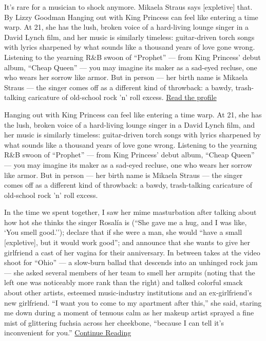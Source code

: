 It's rare for a musician to shock anymore. Mikaela Straus says
{[}expletive{]} that. By Lizzy Goodman Hanging out with King Princess
can feel like entering a time warp. At 21, she has the lush, broken
voice of a hard-living lounge singer in a David Lynch film, and her
music is similarly timeless: guitar-driven torch songs with lyrics
sharpened by what sounds like a thousand years of love gone wrong.
Listening to the yearning R\&B swoon of ``Prophet'' --- from King
Princess' debut album, ``Cheap Queen'' --- you may imagine its maker as
a sad-eyed recluse, one who wears her sorrow like armor. But in person
--- her birth name is Mikaela Straus --- the singer comes off as a
different kind of throwback: a bawdy, trash-talking caricature of
old-school rock 'n' roll excess.
\href{https://www.nytimes3xbfgragh.onion/interactive/2020/03/11/magazine/king-princess-profile.html}{Read
the profile}

Hanging out with King Princess can feel like entering a time warp. At
21, she has the lush, broken voice of a hard-living lounge singer in a
David Lynch film, and her music is similarly timeless: guitar-driven
torch songs with lyrics sharpened by what sounds like a thousand years
of love gone wrong. Listening to the yearning R\&B swoon of ``Prophet''
--- from King Princess' debut album, ``Cheap Queen'' --- you may imagine
its maker as a sad-eyed recluse, one who wears her sorrow like armor.
But in person --- her birth name is Mikaela Straus --- the singer comes
off as a different kind of throwback: a bawdy, trash-talking caricature
of old-school rock 'n' roll excess.

In the time we spent together, I saw her mime masturbation after talking
about how hot she thinks the singer Rosalía is (``She gave me a hug, and
I was like, `You smell good.''); declare that if she were a man, she
would ``have a small {[}expletive{]}, but it would work good''; and
announce that she wants to give her girlfriend a cast of her vagina for
their anniversary. In between takes at the video shoot for ``Ohio'' ---
a slow-burn ballad that descends into an unhinged rock jam --- she asked
several members of her team to smell her armpits (noting that the left
one was noticeably more rank than the right) and talked colorful smack
about other artists, esteemed music-industry institutions and an
ex-girlfriend's new girlfriend. ``I want you to come to my apartment
after this,'' she said, staring me down during a moment of tenuous calm
as her makeup artist sprayed a fine mist of glittering fuchsia across
her cheekbone, ``because I can tell it's inconvenient for you.''
\href{https://www.nytimes3xbfgragh.onion/interactive/2020/03/11/magazine/king-princess-profile.html}{Continue
Reading}

